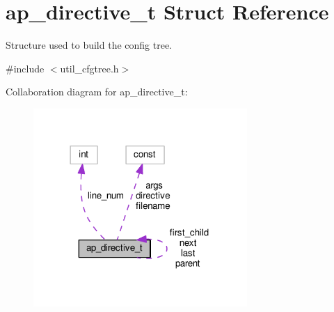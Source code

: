 \hypertarget{structap__directive__t}{}\section{ap\+\_\+directive\+\_\+t Struct Reference}
\label{structap__directive__t}


Structure used to build the config tree.  




{\ttfamily \#include $<$util\+\_\+cfgtree.\+h$>$}



Collaboration diagram for ap\+\_\+directive\+\_\+t\+:
\nopagebreak
\begin{figure}[H]
\begin{center}
\leavevmode
\includegraphics[width=230pt]{structap__directive__t__coll__graph}
\end{center}
\end{figure}
